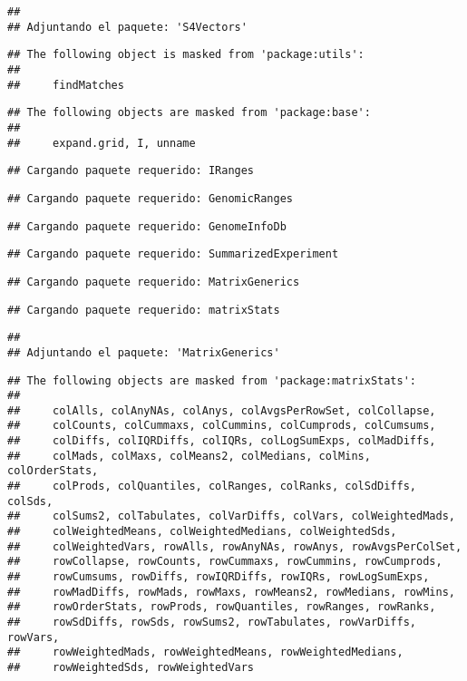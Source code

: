 \documentclass[
]{article}
\begin{document}
\begin{verbatim}
## 
## Adjuntando el paquete: 'S4Vectors'
\end{verbatim}

\begin{verbatim}
## The following object is masked from 'package:utils':
## 
##     findMatches
\end{verbatim}

\begin{verbatim}
## The following objects are masked from 'package:base':
## 
##     expand.grid, I, unname
\end{verbatim}

\begin{verbatim}
## Cargando paquete requerido: IRanges
\end{verbatim}

\begin{verbatim}
## Cargando paquete requerido: GenomicRanges
\end{verbatim}

\begin{verbatim}
## Cargando paquete requerido: GenomeInfoDb
\end{verbatim}

\begin{verbatim}
## Cargando paquete requerido: SummarizedExperiment
\end{verbatim}

\begin{verbatim}
## Cargando paquete requerido: MatrixGenerics
\end{verbatim}

\begin{verbatim}
## Cargando paquete requerido: matrixStats
\end{verbatim}

\begin{verbatim}
## 
## Adjuntando el paquete: 'MatrixGenerics'
\end{verbatim}

\begin{verbatim}
## The following objects are masked from 'package:matrixStats':
## 
##     colAlls, colAnyNAs, colAnys, colAvgsPerRowSet, colCollapse,
##     colCounts, colCummaxs, colCummins, colCumprods, colCumsums,
##     colDiffs, colIQRDiffs, colIQRs, colLogSumExps, colMadDiffs,
##     colMads, colMaxs, colMeans2, colMedians, colMins, colOrderStats,
##     colProds, colQuantiles, colRanges, colRanks, colSdDiffs, colSds,
##     colSums2, colTabulates, colVarDiffs, colVars, colWeightedMads,
##     colWeightedMeans, colWeightedMedians, colWeightedSds,
##     colWeightedVars, rowAlls, rowAnyNAs, rowAnys, rowAvgsPerColSet,
##     rowCollapse, rowCounts, rowCummaxs, rowCummins, rowCumprods,
##     rowCumsums, rowDiffs, rowIQRDiffs, rowIQRs, rowLogSumExps,
##     rowMadDiffs, rowMads, rowMaxs, rowMeans2, rowMedians, rowMins,
##     rowOrderStats, rowProds, rowQuantiles, rowRanges, rowRanks,
##     rowSdDiffs, rowSds, rowSums2, rowTabulates, rowVarDiffs, rowVars,
##     rowWeightedMads, rowWeightedMeans, rowWeightedMedians,
##     rowWeightedSds, rowWeightedVars
\end{verbatim}
\end{document}
